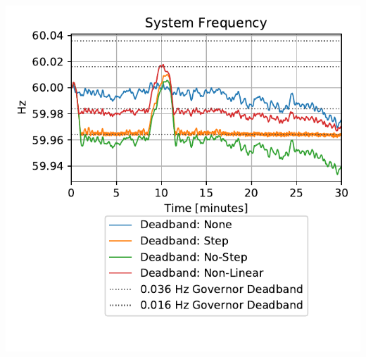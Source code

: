 \documentclass[12pt]{article}
\begin{document}
\begin{multicols}{2}
\includegraphics[width=\linewidth]{miniWECCnoiseNLdroopDBFreq}

\vfill
\columnbreak


\end{multicols}


\end{document}
